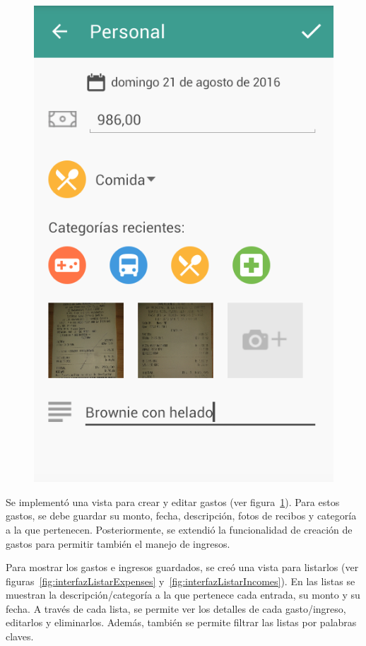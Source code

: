 \begin{figure}[ht]
\begin{minipage}{.5\textwidth}
  \includegraphics[scale=0.4,type=png,ext=.png,read=.png]{imagenes/create_entry}
  \captionsetup{justification=centering}
  \label{fig:interfazCrearEntry}
\end{minipage}
\end{figure}



Se implementó una vista para crear y editar gastos (ver figura~\ref{fig:interfazCrearEntry}). Para estos gastos, se debe guardar su monto, fecha, descripción, fotos de recibos y categoría a la que pertenecen. Posteriormente, se extendió la funcionalidad de creación de gastos para permitir también el manejo de ingresos. 

Para mostrar los gastos e ingresos guardados, se creó una vista para listarlos (ver figuras~\ref{fig:interfazListarExpenses} y~\ref{fig:interfazListarIncomes}). En las listas se muestran la descripción/categoría a la que pertenece cada entrada, su monto y su fecha. A través de cada lista, se permite ver los detalles de cada gasto/ingreso, editarlos y eliminarlos. Además, también se permite filtrar las listas por palabras claves. 

